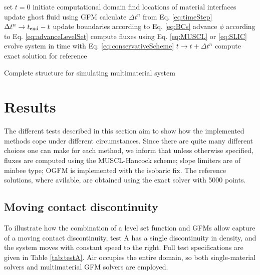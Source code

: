 \documentclass[final,3p,twocolumn]{elsarticle}
\begin{document}
\begin{algorithm}[htb]
    set $t=0$\; 
    initiate computational domain\;
    {
        find locations of material interfaces\;
        {
            update ghost fluid using GFM\;
        }
        calculate $\Delta t^n$ from Eq. \eqref{eq:timeStep}\;
        {
            $\Delta t^n \rightarrow t_{\rm end} - t$ \;
        }
        update boundaries according to Eq. \eqref{eq:BCs}\;
        advance $\phi$ according to Eq. \eqref{eq:advanceLevelSet}\;
        {
            compute fluxes using Eq. \eqref{eq:MUSCL} or \eqref{eq:SLIC}\;
            evolve system in time with Eq.
            \eqref{eq:conservativeScheme}\;
        }
        $t \rightarrow t + \Delta t^n$\;
    }
    {
        compute exact solution for reference\;
    }
    \caption{Complete structure for simulating multimaterial system}
    \label{alg:complete}
\end{algorithm}

\section{Results}
\label{sec:results}

The different tests described in this section aim to show how the implemented
methods cope under different circumstances. Since there are quite many
different choices one can make for each method, we inform that unless otherwise
specified, fluxes are computed using the MUSCL-Hancock scheme; slope limiters
are of minbee type; OGFM is implemented with the isobaric fix. The reference
solutions, where avilable, are obtained using the exact solver with 5000
points.

\subsection{Moving contact discontinuity}
\label{subsec:moving}

To illustrate how the combination of a level set function and GFMs allow
capture of a moving contact discontinuity, test A has a single discontinuity in
density, and the system moves with constant speed to the right. Full test
specifications are given in Table \ref{tab:testA}. Air occupies the entire
domain, so both single-material solvers and multimaterial GFM solvers are
employed. 
\end{document}
